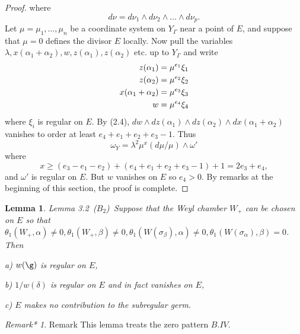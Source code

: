 \documentclass{memo-l}
\newtheorem{lemma}[theorem]{Lemma}
\theoremstyle{definition}
\theoremstyle{remark}
\newtheorem{remark*}{Remark*} %
\numberwithin{section}{chapter}
\numberwithin{equation}{chapter}
\begin{document}
\begin{proof}
\noindent
where 
$$
d{\nu} = d{\nu}_{1}\wedge d{\nu}_{2}\wedge \ldots \wedge d{\nu}_{p} .
$$
Let ${\mu} = {\mu}_{1},\ldots , {\mu}_{n}$ be a coordinate system on 
$Y_{{\Gamma}}$ near a point of $E$, and suppose that ${\mu} = 0$ defines the 
divisor $E$ locally. 
 Now pull the variables ${\lambda}, x({\alpha}_{1}+{\alpha}_{2}), w, 
z({\alpha}_{1}), z({\alpha}_{2})$ etc. 
up to $Y_{{\Gamma}}$ and write
$$
\aligned
z({\alpha}_{1}) &= {\mu}^{e_1} {\xi}_{1}\\
z({\alpha}_{2}) &= {\mu}^{e_2} {\xi}_{2} \\
x({\alpha}_{1}+{\alpha}_{2}) &= {\mu}^{e_3} {\xi}_{3} \\
w &= {\mu}^{e_4} {\xi}_{4}
\endaligned
$$
where ${\xi}_{i}$ is regular on $E$. 
 By (2.4), $dw\wedge dz({\alpha}_{1})\wedge dz({\alpha}_{2})\wedge 
dx({\alpha}_{1}+{\alpha}_{2})$ vanishes to order at least $e_{4}+e_{1}+
e_{2}+e_{3}-1$. 
 Thus 
$$
{\omega}_{Y} = {\lambda}^{2}{\mu}^{x}(d{\mu}/{\mu})\wedge {\omega}'
$$
where 
$$
x \ge  (e_{3}-e_{1}-e_{2}) + (e_{4}+e_{1}+e_{2}+e_{3}-1) + 1 
= 2e_{3}+e_{4} ,
$$ 
and ${\omega}'$ is regular on $E$. 
 But $w$ vanishes on $E$ so $e_{4} > 0$. 
 By remarks at the beginning of this section, the proof is complete.
\end{proof}
{\medskip}

\begin{lemma}{Lemma 3.2}\  ($B_{2}$)\ Suppose that the Weyl chamber $W_{+}$ can be 
chosen on $E$ so that ${\theta}_{1}(W_{+},{\alpha})\ne 0, {\theta}_{1}(W_{+},
{\beta})\ne 0, {\theta}_{1}(W({\sigma}_{\beta}),{\alpha})\ne 0, 
{\theta}_{1}(W({\sigma}_{\alpha}),{\beta}) = 0$. 
 Then

\noindent
a)    $w({\g})$ is regular on $E$,

\noindent
b)   $1/w({\delta})$ is regular on $E$ and in fact vanishes on $E$,

\noindent
c)   $E$ makes no contribution to the subregular germ.
\end{lemma}

\begin{remark*}{Remark}    This lemma treats the zero pattern $B.IV$.
\end{remark*}

\medskip
\end{document}
